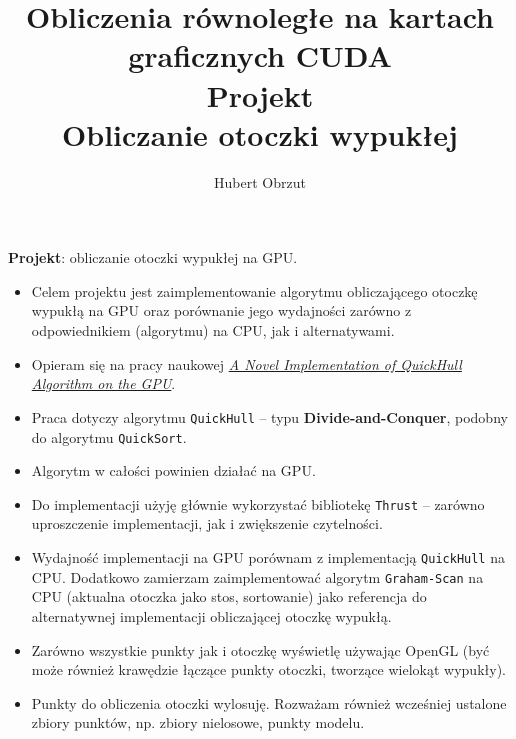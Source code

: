 \documentclass[11pt]{article}
\title{
	Obliczenia równoległe na kartach graficznych CUDA \\
	Projekt \\
	Obliczanie otoczki wypukłej \\
}
\author{Hubert Obrzut}
\date{}
\begin{document}
	\maketitle
	
	\large
	
	\textbf{Projekt}: obliczanie otoczki wypukłej na GPU.
	
	\begin{itemize}
		\item Celem projektu jest zaimplementowanie algorytmu obliczającego otoczkę wypukłą na GPU oraz porównanie jego wydajności zarówno z odpowiednikiem (algorytmu) na CPU, jak i alternatywami.
		\item Opieram się na pracy naukowej \href{https://www.researchgate.net/publication/271146554_A_Novel_Implementation_of_QuickHull_Algorithm_on_the_GPU}{\textit{A Novel Implementation of QuickHull Algorithm on the GPU}}.
		\item Praca dotyczy algorytmu \texttt{QuickHull} -- typu \textbf{Divide-and-Conquer}, podobny do algorytmu \texttt{QuickSort}.
		\item Algorytm w całości powinien działać na GPU.
		\item Do implementacji użyję głównie wykorzystać bibliotekę \texttt{Thrust} -- zarówno uproszczenie implementacji, jak i zwiększenie czytelności.
		\item Wydajność implementacji na GPU porównam z implementacją \texttt{QuickHull} na CPU. Dodatkowo zamierzam zaimplementować algorytm \texttt{Graham-Scan} na CPU (aktualna otoczka jako stos, sortowanie) jako referencja do alternatywnej implementacji obliczającej otoczkę wypukłą.
		\item Zarówno wszystkie punkty jak i otoczkę wyświetlę używając OpenGL (być może również krawędzie łączące punkty otoczki, tworzące wielokąt wypukły).
		\item Punkty do obliczenia otoczki wylosuję. Rozważam również wcześniej ustalone zbiory punktów, np. zbiory nielosowe, punkty modelu.
	\end{itemize}
	
\end{document}
